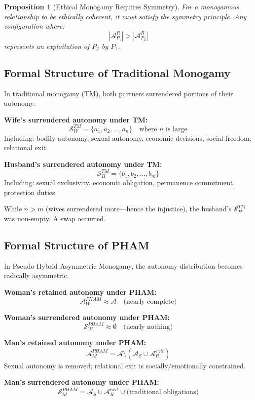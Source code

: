 \documentclass[12pt, letterpaper]{article}
\newtheorem{proposition}{Proposition}[section]
\begin{document}
\begin{proposition}[Ethical Monogamy Requires Symmetry]
For a monogamous relationship to be ethically coherent, it must satisfy the symmetry principle. Any configuration where:
\[
|\mathcal{A}_{P_1}^R| > |\mathcal{A}_{P_2}^R|
\]
represents an exploitation of $P_2$ by $P_1$.
\end{proposition}

\subsection{Formal Structure of Traditional Monogamy}

In traditional monogamy (TM), both partners surrendered portions of their autonomy:

\textbf{Wife's surrendered autonomy under TM:}
\[
\mathcal{S}_W^{TM} = \{a_1, a_2, ..., a_n\} \quad \text{where } n \text{ is large}
\]
Including: bodily autonomy, sexual autonomy, economic decisions, social freedom, relational exit.

\textbf{Husband's surrendered autonomy under TM:}
\[
\mathcal{S}_H^{TM} = \{b_1, b_2, ..., b_m\}
\]
Including: sexual exclusivity, economic obligation, permanence commitment, protection duties.

While $n > m$ (wives surrendered more---hence the injustice), the husband's $\mathcal{S}_H^{TM}$ was non-empty. A swap occurred.

\subsection{Formal Structure of PHAM}

In Pseudo-Hybrid Asymmetric Monogamy, the autonomy distribution becomes radically asymmetric.

\textbf{Woman's retained autonomy under PHAM:}
\[
\mathcal{A}_W^{PHAM} \approx \mathcal{A} \quad \text{(nearly complete)}
\]

\textbf{Woman's surrendered autonomy under PHAM:}
\[
\mathcal{S}_W^{PHAM} \approx \emptyset \quad \text{(nearly nothing)}
\]

\textbf{Man's retained autonomy under PHAM:}
\[
\mathcal{A}_M^{PHAM} = \mathcal{A} \setminus (\mathcal{A}_S \cup \mathcal{A}_R^{exit})
\]
Sexual autonomy is removed; relational exit is socially/emotionally constrained.

\textbf{Man's surrendered autonomy under PHAM:}
\[
\mathcal{S}_M^{PHAM} = \mathcal{A}_S \cup \mathcal{A}_R^{exit} \cup \text{(traditional obligations)}
\]
\end{document}
